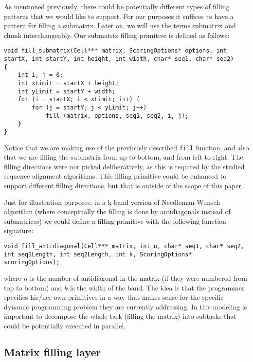 \documentclass[journal]{IEEEtran}
\begin{document}
As mentioned previously, there could be potentially different types of filling patterns that we would like to support. For our purposes it suffices to have a pattern for filling a submatrix. Later on, we will use the terms submatrix and chunk interchangeably. Our submatrix filling primitive is defined as follows:

\lstset{language=C}
\begin{lstlisting}[linewidth=\columnwidth,breaklines=true]
void fill_submatrix(Cell*** matrix, ScoringOptions* options, int startX, int startY, int height, int width, char* seq1, char* seq2) 
{
	int i, j = 0;
	int xLimit = startX + height;
	int yLimit = startY + width;
	for (i = startX; i < xLimit; i++) {
		for (j = startY; j < yLimit; j++)
			fill (matrix, options, seq1, seq2, i, j);
	}
}
\end{lstlisting}

Notice that we are making use of the previously described {\tt fill} function, and also that we are filling the submatrix from up to bottom, and from left to right. The filling directions were not picked deliberatively, as this is required by the studied sequence alignment algorithms. This filling primitive could be enhanced to support different filling directions, but that is outside of the scope of this paper.

Just for illustration purposes, in a k-band version of Needleman-Wunsch algorithm (where conceptually the filling is done by antidiagonals instead of submatrices) we could define a filling primitive with the following function signature:

\lstset{language=C}
\begin{lstlisting}[linewidth=\columnwidth,breaklines=true]
void fill_antidiagonal(Cell*** matrix, int n, char* seq1, char* seq2, int seq1Length, int seq2Length, int k, ScoringOptions* scoringOptions);
\end{lstlisting}

where $n$ is the number of antidiagonal in the matrix (if they were numbered from top to bottom) and $k$ is the width of the band. The idea is that the programmer specifies his/her own primitives in a way that makes sense for the specific dynamic programming problem they are currently addressing. In this modeling is important to decompose the whole task (filling the matrix) into subtasks that could be potentially executed in parallel.

\subsection{Matrix filling layer}
\end{document}
